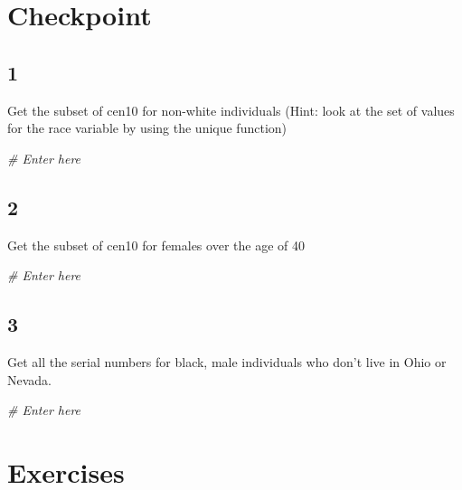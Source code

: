 \documentclass[
]{book}
\newenvironment{Shaded}{\begin{snugshade}}{\end{snugshade}}
\newcommand{\CommentTok}[1]{\textcolor[rgb]{0.56,0.35,0.01}{\textit{#1}}}
\theoremstyle{definition}
\theoremstyle{definition}
\theoremstyle{definition}
\theoremstyle{remark}
\begin{document}
\hypertarget{checkpoint}{%
\section*{Checkpoint}\label{checkpoint}}

\hypertarget{section-6}{%
\subsection*{1}\label{section-6}}

Get the subset of cen10 for non-white individuals (Hint: look at the set of values for the race variable by using the unique function)

\begin{Shaded}
\begin{Highlighting}[]
\CommentTok{\# Enter here}
\end{Highlighting}
\end{Shaded}

\hypertarget{section-7}{%
\subsection*{2}\label{section-7}}

Get the subset of cen10 for females over the age of 40

\begin{Shaded}
\begin{Highlighting}[]
\CommentTok{\# Enter here}
\end{Highlighting}
\end{Shaded}

\hypertarget{section-8}{%
\subsection*{3}\label{section-8}}

Get all the serial numbers for black, male individuals who don't live in Ohio or Nevada.

\begin{Shaded}
\begin{Highlighting}[]
\CommentTok{\# Enter here}
\end{Highlighting}
\end{Shaded}

\hypertarget{exercises-1}{%
\section*{Exercises}\label{exercises-1}}
\end{document}
